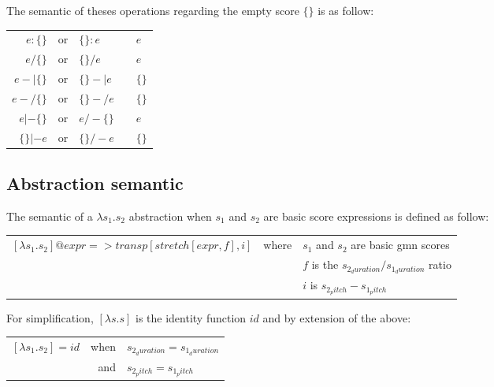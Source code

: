 \documentclass[10pt,a4paper,frenchb]{article}
\makeatletter
\newcommand{\es}		{\{\}}
\newcommand{\applyop}	{\ensuremath{@}}
\newcommand{\seq}			{:}
\makeatother
\begin{document}
The semantic of theses operations regarding the empty score $\es$ is as follow:
\begin{center}
\begin{tabular}{rclc@{$\rightarrow$\ }l}
 $e \seq \es$ & or & $\es \seq e$ &  & $e$  \\
 $e / \es$ & or & $\es / e$ &  & $e$  \\
 $e -| \es$ & or & $\es -| e$ &  & $\es$  \\
 $e -/ \es$ & or & $\es -/ e$ &  & $\es$  \\
 $e |- \es$ & or & $e /- \es$ &  & $e$  \\
 $\es |- e$ & or & $\es /- e$ &  & $\es$  \\
\end{tabular}
\end{center}


\subsection{Abstraction semantic}

The semantic of a $\lambda s_1.s_2$ abstraction when $s_1$ and $s_2$ are basic score expressions is defined as follow:

\begin{center}
\begin{tabular}{rcl}
 $[\lambda s_1.s_2] \applyop expr => transp[stretch[expr, f], i]$ & where & $s_1$ and $s_2$ are basic gmn scores \\
 	& & $f$ is the $s_{2_duration} / s_{1_duration}$ ratio \\
 	& & $i$ is $s_{2_pitch} - s_{1_pitch}$ \\
\end{tabular}
\end{center}

For simplification, $[\lambda s.s]$ is the identity function $id$ and by extension of the above:
\vspace{-6mm}\\ 
\begin{center}
\begin{tabular}{rrl}
 $[\lambda s_1.s_2] = id$ & when & $s_{2_duration} = s_{1_duration}$ \\
 	& and & $s_{2_pitch} = s_{1_pitch}$ \\
\end{tabular}
\end{center}
\end{document}
